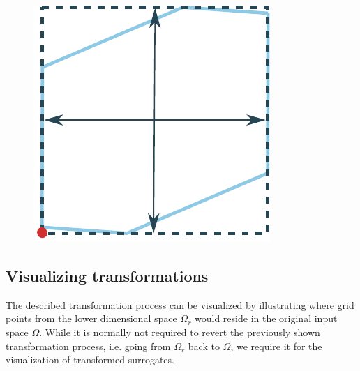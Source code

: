 \documentclass[
  a4paper,  %
  twoside,  %
  bibliography=totoc,
  headsepline,
  cleardoublepage=empty,
  parskip=half,
  draft=false
]{scrbook}
\begin{document}
\begin{mdframed}[style=style]
\begin{figure}[H]

        \centering
\begin{minipage}{.49\textwidth}
        \centering
  \label{fig:aligned}
    \end{minipage}%
    \begin{minipage}{0.49\textwidth}
        \centering
   \includegraphics[width=0.8\linewidth]{graphics/surrogate_space_unit}
    \end{minipage}

\end{figure}
\end{mdframed}


\subsection{Visualizing transformations}
\label{sec:vis_trans}

The described transformation process can be visualized by illustrating where grid points from the lower dimensional space $\Omega_r$ would reside in the original input space $\Omega$. 
While it is normally not required to revert the previously shown transformation process, i.e. going from $\Omega_r$ back to $\Omega$, we require it for the visualization of transformed surrogates.
\end{document}
